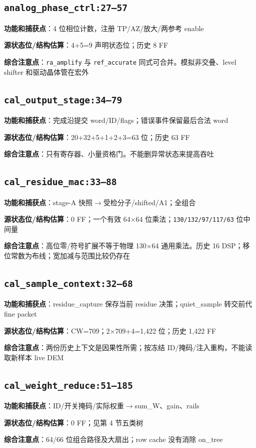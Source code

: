 \documentclass[UTF8,fontset=fandol,10pt,a4paper,openany]{ctexrep}
\newcommand{\code}[1]{\nolinkurl{#1}}
\begin{document}
\subsection*{\code{analog_phase_ctrl:27–57}}
\noindent\textbf{功能和捕获点}：4 位相位计数，注册 TP/AZ/放大/两参考 enable\par
\noindent\textbf{源状态位/结构估算}：4+5=9 声明状态位；历史 8 FF\par
\noindent\textbf{综合注意点}：\code{ra_amplify} 与 \code{ref_accurate} 同式可合并。模拟非交叠、level shifter 和驱动晶体管在宏外\par
\subsection*{\code{cal_output_stage:34–79}}
\noindent\textbf{功能和捕获点}：完成沿提交 word/ID/flags；错误事件保留最后合法 word\par
\noindent\textbf{源状态位/结构估算}：20+32+5+1+2+3=63 位；历史 63 FF\par
\noindent\textbf{综合注意点}：只有寄存器、小量资格门。不能删异常状态来提高吞吐\par
\subsection*{\code{cal_residue_mac:33–88}}
\noindent\textbf{功能和捕获点}：stage-A 快照\ensuremath{\rightarrow}受检分子/shifted/A1；全组合\par
\noindent\textbf{源状态位/结构估算}：0 FF；一个有效 64\ensuremath{\times}64 位乘法；\code{130/132/97/117/63} 位中间量\par
\noindent\textbf{综合注意点}：高位零/符号扩展不等于物理 130\ensuremath{\times}64 通用乘法。历史 16 DSP；移位常数为布线；宽加减与范围比较仍存在\par
\subsection*{\code{cal_sample_context:32–68}}
\noindent\textbf{功能和捕获点}：residue\_capture 保存当前 residue 决策；quiet\_sample 转交前代 fine packet\par
\noindent\textbf{源状态位/结构估算}：CW=709；2\ensuremath{\times}709+4=1,422 位；历史 1,422 FF\par
\noindent\textbf{综合注意点}：两份历史上下文是因果性所需；按冻结 ID/掩码/注入重构，不能读取新样本 live DEM\par
\subsection*{\code{cal_weight_reduce:51–185}}
\noindent\textbf{功能和捕获点}：ID/开关掩码/实际权重\ensuremath{\rightarrow}sum\_W、gain、rails\par
\noindent\textbf{源状态位/结构估算}：0 FF；见第 4 节五类树\par
\noindent\textbf{综合注意点}：64/66 位组合路径及大扇出；row cache 没有消除 on\_tree\par
\end{document}

